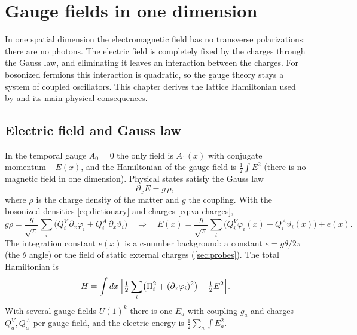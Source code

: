 \chapter{Gauge fields in one dimension}\label{chap:gauge}

In one spatial dimension the electromagnetic field has no transverse polarizations: there are no photons. The
electric field is completely fixed by the charges through the Gauss law, and eliminating it leaves an
interaction between the charges. For bosonized fermions this interaction is quadratic, so the gauge theory stays
a system of coupled oscillators. This chapter derives the lattice Hamiltonian used by
 and its main physical consequences.

\section{Electric field and Gauss law}
In the temporal gauge $A_0 = 0$ the only field is $A_1(x)$ with conjugate momentum $-E(x)$, and the Hamiltonian
of the gauge field is $\frac12\int E^2$ (there is no magnetic field in one dimension). Physical states satisfy
the Gauss law
\begin{equation}\label{eq:gauss}
  \partial_x E = g\,\rho ,
\end{equation}
where $\rho$ is the charge density of the matter and $g$ the coupling. With the bosonized densities
\eqref{eq:dictionary} and charges \eqref{eq:va-charges},
\begin{equation}
  g\rho = \frac{g}{\sqrt\pi}\sum_i\bigl(Q^V_i\,\partial_x\varphi_i + Q^A_i\,\partial_x\vartheta_i\bigr)
  \quad\Rightarrow\quad
  E(x) = \frac{g}{\sqrt\pi}\sum_i\bigl(Q^V_i\varphi_i(x) + Q^A_i\vartheta_i(x)\bigr) + e(x) .
\end{equation}
The integration constant $e(x)$ is a c-number background: a constant $e = g\theta/2\pi$ (the $\theta$ angle) or
the field of static external charges (\cref{sec:probes}). The total Hamiltonian is
\begin{equation}\label{eq:H-gauge}
  H = \int dx\,\Bigl[\tfrac12\sum_i\bigl(\Pi_i^2 + (\partial_x\varphi_i)^2\bigr) + \tfrac12 E^2\Bigr].
\end{equation}
With several gauge fields $U(1)^k$ there is one $E_a$ with coupling $g_a$ and charges $Q^V_a, Q^A_a$ per gauge
field, and the electric energy is $\frac12\sum_a\int E_a^2$.

